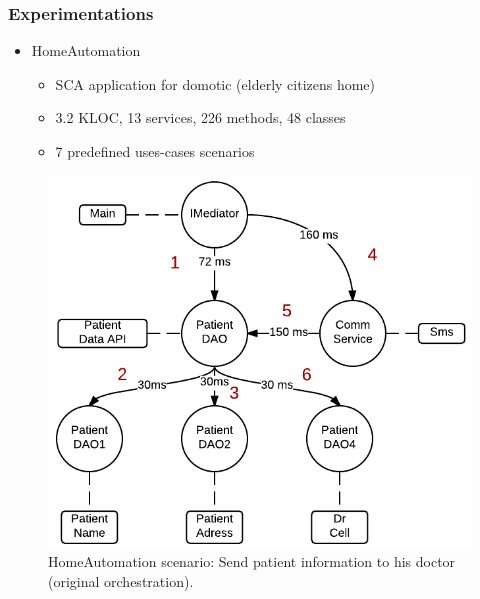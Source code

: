 \documentclass{beamer}
\begin{document}
\begin{frame}
\frametitle{Experimentations}

\begin{itemize}
\item HomeAutomation
\begin{itemize}
\item SCA application for domotic (elderly citizens home)
\item 3.2 KLOC, 13 services, 226 methods, 48 classes
\item 7 predefined uses-cases scenarios
\end{itemize}
\end{itemize}
\begin{figure}
    \centering
	\includegraphics[scale=0.3]{media/scenario1.png}
 	\caption{HomeAutomation scenario: Send patient information to his doctor (original
orchestration).}
    \label{fig:multiple_orienteering}
\end{figure}
\end{frame}
\end{document}
